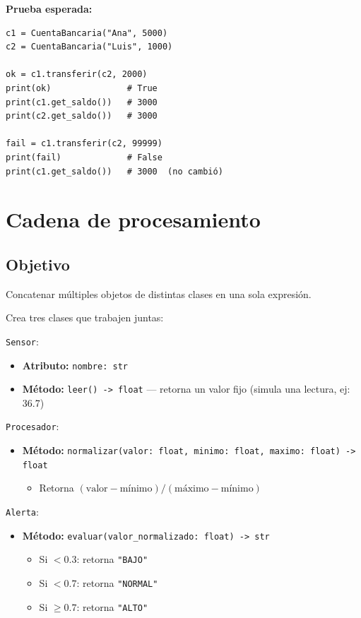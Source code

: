 \documentclass[11pt,letterpaper]{article}
\begin{document}
\textbf{Prueba esperada:}
\begin{lstlisting}
c1 = CuentaBancaria("Ana", 5000)
c2 = CuentaBancaria("Luis", 1000)

ok = c1.transferir(c2, 2000)
print(ok)               # True
print(c1.get_saldo())   # 3000
print(c2.get_saldo())   # 3000

fail = c1.transferir(c2, 99999)
print(fail)             # False
print(c1.get_saldo())   # 3000  (no cambió)
\end{lstlisting}

\section{Cadena de procesamiento}
\subsection{Objetivo} Concatenar múltiples objetos de distintas clases en una sola expresión.

Crea tres clases que trabajen juntas:

\texttt{Sensor}:
\begin{itemize}[nosep]
  \item \textbf{Atributo:} \texttt{nombre: str}
  \item \textbf{Método:} \texttt{leer() -> float} --- retorna un valor fijo (simula una lectura, ej: 36.7)
\end{itemize}

\texttt{Procesador}:
\begin{itemize}[nosep]
  \item \textbf{Método:} \texttt{normalizar(valor: float, minimo: float, maximo: float) -> float}
  \begin{itemize}[nosep]
    \item Retorna $(\text{valor} - \text{mínimo}) / (\text{máximo} - \text{mínimo})$
  \end{itemize}
\end{itemize}

\texttt{Alerta}:
\begin{itemize}[nosep]
  \item \textbf{Método:} \texttt{evaluar(valor\_normalizado: float) -> str}
  \begin{itemize}[nosep]
    \item Si $< 0.3$: retorna \texttt{"BAJO"}
    \item Si $< 0.7$: retorna \texttt{"NORMAL"}
    \item Si $\geq 0.7$: retorna \texttt{"ALTO"}
  \end{itemize}
\end{itemize}
\end{document}
